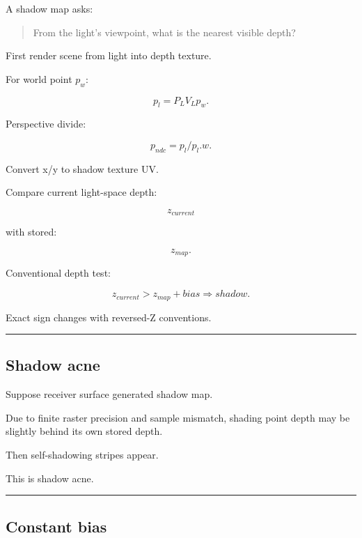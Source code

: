\hypertarget{04-visual-computing-ii-ch040-shadow-mapping}{}

A shadow map asks:

\begin{quote}
From the light's viewpoint, what is the nearest visible depth?
\end{quote}

First render scene from light into depth texture.

For world point \(p_w\):

\[
p_l=
P_LV_Lp_w.
\]

Perspective divide:

\[
p_{ndc}
=
p_l/p_l.w.
\]

Convert x/y to shadow texture UV.

Compare current light-space depth:

\[
z_{current}
\]

with stored:

\[
z_{map}.
\]

Conventional depth test:

\[
\boxed{
z_{current}
>
z_{map}+bias
\Rightarrow
shadow.
}
\]

Exact sign changes with reversed-Z conventions.

\begin{center}\rule{0.5\linewidth}{0.5pt}\end{center}

\subsection{Shadow acne}\label{04-visual-computing-ii-ch040-shadow-acne}

\hypertarget{04-visual-computing-ii-ch040-shadow-acne}{}

Suppose receiver surface generated shadow map.

Due to finite raster precision and sample mismatch, shading point depth may be slightly behind its own stored depth.

Then self-shadowing stripes appear.

This is shadow acne.

\begin{center}\rule{0.5\linewidth}{0.5pt}\end{center}

\subsection{Constant bias}\label{04-visual-computing-ii-ch040-constant-bias}

